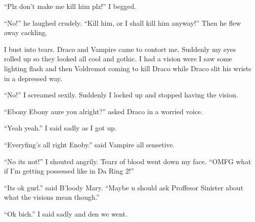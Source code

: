 \enquote{Plz don't make me kill him plz!} I begged.

\enquote{No!} he laughed crudely. \enquote{Kill him, or I shall kill him anyway!} Then he flew away cackling.

I bust into tears. Draco and Vampire came to contort me. Suddenly my eyes rolled up so they looked all cool and gothic. I had a vision were I saw some lighting flash and then Voldremot coming to kill Draco while Draco slit his wrists in a depressed way.

\enquote{No!} I screamed sexily. Suddenly I locked up and stopped having the vision.

\enquote{Ebony Ebony aure you alright?} asked Draco in a worried voice.

\enquote{Yeah yeah.} I said sadly as I got up.

\enquote{Everyfing's all right Enoby.} said Vampire all sensetive.

\enquote{No its not!} I shouted angrily. Tearz of blood went down my face. \enquote{OMFG what if I'm getting possessed like in Da Ring 2!}

\enquote{Its ok gurl.} said B'loody Mary. \enquote{Maybe u should ask Proffesor Sinister about what the visions mean though.}

\enquote{Ok bich.} I said sadly and den we went.

